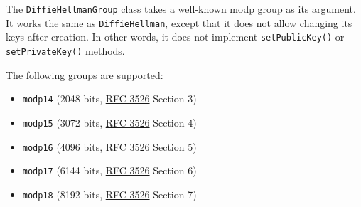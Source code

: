 The \texttt{DiffieHellmanGroup} class takes a well-known modp group as
its argument. It works the same as \texttt{DiffieHellman}, except that
it does not allow changing its keys after creation. In other words, it
does not implement \texttt{setPublicKey()} or \texttt{setPrivateKey()}
methods.

\begin{Shaded}
\begin{Highlighting}[]
\OperatorTok{=}  \NormalTok{(}\NormalTok{)}\OperatorTok{;}
\OperatorTok{=} \NormalTok{(}\NormalTok{)}\OperatorTok{;}
\end{Highlighting}
\end{Shaded}

\begin{Shaded}
\begin{Highlighting}[]
\OperatorTok{=} \NormalTok{(}\NormalTok{)}\OperatorTok{;}
\OperatorTok{=} \NormalTok{(}\NormalTok{)}\OperatorTok{;}
\end{Highlighting}
\end{Shaded}

The following groups are supported:

\begin{itemize}
\tightlist
\item
  \texttt{\textquotesingle{}modp14\textquotesingle{}} (2048 bits,
  \href{https://www.rfc-editor.org/rfc/rfc3526.txt}{RFC 3526} Section 3)
\item
  \texttt{\textquotesingle{}modp15\textquotesingle{}} (3072 bits,
  \href{https://www.rfc-editor.org/rfc/rfc3526.txt}{RFC 3526} Section 4)
\item
  \texttt{\textquotesingle{}modp16\textquotesingle{}} (4096 bits,
  \href{https://www.rfc-editor.org/rfc/rfc3526.txt}{RFC 3526} Section 5)
\item
  \texttt{\textquotesingle{}modp17\textquotesingle{}} (6144 bits,
  \href{https://www.rfc-editor.org/rfc/rfc3526.txt}{RFC 3526} Section 6)
\item
  \texttt{\textquotesingle{}modp18\textquotesingle{}} (8192 bits,
  \href{https://www.rfc-editor.org/rfc/rfc3526.txt}{RFC 3526} Section 7)
\end{itemize}

